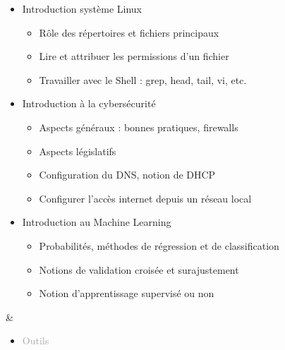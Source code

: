 \documentclass{article}
\begin{document}
\begin{tabular}
\begin{itemize}
\begin{itemize}
            \item \textcolor{gray!100}{Introduction système Linux}
            \begin{itemize}
                [label={\textcolor{gray!100}{$\triangleright$}}, topsep=0pt, partopsep=0pt, itemsep=0.5pt, parsep=2pt]
                \item \textcolor{gray!100}{Rôle des répertoires et fichiers principaux}
                \item \textcolor{gray!100}{Lire et attribuer les permissions d'un fichier}
                \item \textcolor{gray!100}{Travailler avec le Shell : grep, head, tail, vi, etc. }
            \end{itemize}
            \item \textcolor{gray!100}{Introduction à la cybersécurité}       
            \begin{itemize}
                [label={\textcolor{gray!100}{$\triangleright$}}, topsep=0pt, partopsep=0pt, itemsep=0.5pt, parsep=2pt]
                \item \textcolor{gray!100}{Aspects généraux : bonnes pratiques, firewalls}
                \item \textcolor{gray!100}{Aspects législatifs}
                \item \textcolor{gray!100}{Configuration du DNS, notion de DHCP }  
                \item \textcolor{gray!100}{Configurer l'accès internet depuis un réseau local}
            \end{itemize}
            \item \textcolor{gray!100}{Introduction au Machine Learning} 
            \begin{itemize}
                [label={\textcolor{gray!100}{$\triangleright$}}, topsep=0pt, partopsep=0pt, itemsep=0.5pt, parsep=2pt]
                \item \textcolor{gray!100}{Probabilités, méthodes de régression et de classification}
                \item \textcolor{gray!100}{Notions de validation croisée et surajustement}
                \item \textcolor{gray!100}{Notion d'apprentissage supervisé ou non}
            \end{itemize}
        \end{itemize}
    \end{itemize}
    &
    \begin{itemize}
        [label={}, topsep=8pt, partopsep=0pt, itemsep=0.5pt, parsep=2pt]
        \setlength{\itemsep}{10pt}
        \item \textcolor{darkGray}{Outils}
        \begin{itemize}
        [label={\textcolor{gray!100}{\checkmark}}, topsep=8pt, partopsep=0pt, itemsep=0.5pt, parsep=2pt] 
 

\end{itemize}
\end{itemize}
\end{tabular}
\end{document}
